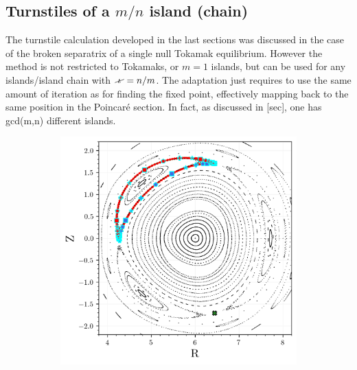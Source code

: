 \subsection{Turnstiles of a $m/n$ island (chain)}

The turnstile calculation developed in the last sections was discussed in the case of the broken separatrix of a single null Tokamak equilibrium. However the method is not restricted to Tokamaks, or $m=1$ islands, but can be used for any islands/island chain with $\iotaslash = n/m$. The adaptation just requires to use the same amount of iteration as for finding the fixed point, effectively mapping back to the same position in the Poincaré section. In fact, as discussed in [sec], one has gcd(m,n) different islands.

\begin{figure}[h!]
    \centering
    \begin{subfigure}[c]{0.49\textwidth}
        \centering
        \includegraphics[width=\textwidth]{images/high-aspect-ratio/heteroclinics_outer_3.png}
        \caption{}
    \end{subfigure}
    \hfill
    \begin{subfigure}[c]{0.49\textwidth}
        \centering

\end{subfigure}
\end{figure}
